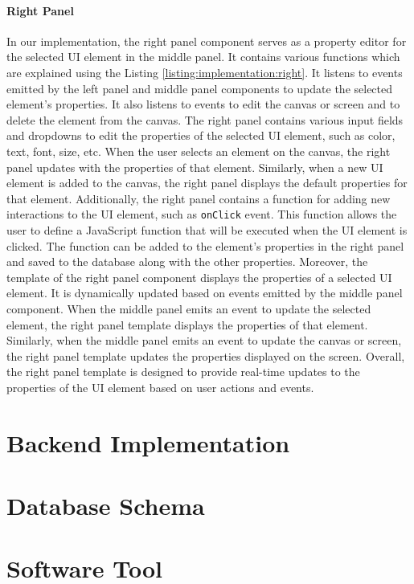 \paragraph{Right Panel}
In our implementation, the right panel component serves as a property editor for the selected UI element in the middle panel. 
It contains various functions which are explained using the Listing \ref{listing:implementation:right}.
It listens to events emitted by the left panel and middle panel components to update the selected element's properties. 
It also listens to events to edit the canvas or screen and to delete the element from the canvas.
The right panel contains various input fields and dropdowns to edit the properties of the selected UI element, such as color, text, font, size, etc. 
When the user selects an element on the canvas, the right panel updates with the properties of that element. 
Similarly, when a new UI element is added to the canvas, the right panel displays the default properties for that element.
Additionally, the right panel contains a function for adding new interactions to the UI element, such as \texttt{onClick} event. 
This function allows the user to define a JavaScript function that will be executed when the UI element is clicked. 
The function can be added to the element's properties in the right panel and saved to the database along with the other properties.
Moreover, the template of the right panel component displays the properties of a selected UI element. 
It is dynamically updated based on events emitted by the middle panel component. 
When the middle panel emits an event to update the selected element, the right panel template displays the properties of that element. 
Similarly, when the middle panel emits an event to update the canvas or screen, the right panel template updates the properties displayed on the screen. 
Overall, the right panel template is designed to provide real-time updates to the properties of the UI element based on user actions and events.

\section{Backend Implementation}
\label{implementation:section:backend}

\section{Database Schema}
\label{implementation:section:database}


\section{Software Tool}
\label{implementation:section:tool}